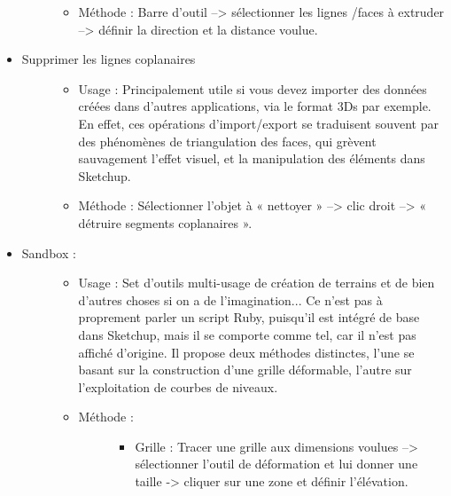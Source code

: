 \documentclass[a4paper,12pt,french]{sphinxmanual}
\begin{document}
\begin{itemize}
\begin{description}
\begin{itemize}
\item {} 
Méthode : Barre d'outil --\textgreater{} sélectionner les lignes /faces à extruder --\textgreater{} définir la direction et la distance voulue.

\end{itemize}

\end{description}

\item {} \begin{description}
\item[{Supprimer les lignes coplanaires}] \leavevmode\begin{itemize}
\item {} 
Usage : Principalement utile si vous devez importer des données créées dans d'autres applications, via le format 3Ds par exemple. En effet, ces opérations d'import/export se traduisent souvent par des phénomènes de triangulation des faces, qui grèvent  sauvagement l'effet visuel, et la manipulation des éléments dans Sketchup.

\item {} 
Méthode : Sélectionner l'objet à « nettoyer » --\textgreater{} clic droit --\textgreater{}  « détruire segments coplanaires ».

\end{itemize}

\end{description}

\item {} \begin{description}
\item[{Sandbox :}] \leavevmode\begin{itemize}
\item {} 
Usage : Set d'outils multi-usage de création de terrains et de bien d'autres choses si on a de l'imagination... Ce n'est pas à proprement parler un script Ruby, puisqu'il est intégré de base dans Sketchup, mais il se comporte comme tel, car il n'est pas affiché d'origine. Il propose deux méthodes distinctes, l'une se basant sur la construction d'une grille déformable, l'autre sur l'exploitation de courbes de niveaux.

\item {} \begin{description}
\item[{Méthode :}] \leavevmode\begin{itemize}
\item {} 
Grille : Tracer une grille aux dimensions voulues --\textgreater{}  sélectionner l'outil de déformation et lui donner une taille -\textgreater{} cliquer sur une zone et définir l'élévation.


\end{itemize}
\end{description}
\end{itemize}
\end{description}
\end{itemize}
\end{document}

